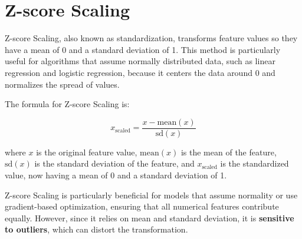 \documentclass[
]{book}
\theoremstyle{definition}
\theoremstyle{definition}
\theoremstyle{definition}
\theoremstyle{definition}
\theoremstyle{remark}
\begin{document}
\section{Z-score Scaling}\label{z-score-scaling}

Z-score Scaling, also known as standardization, transforms feature values so they have a mean of 0 and a standard deviation of 1. This method is particularly useful for algorithms that assume normally distributed data, such as linear regression and logistic regression, because it centers the data around 0 and normalizes the spread of values.

The formula for Z-score Scaling is:

\[
x_{\text{scaled}} = \frac{x - \text{mean}(x)}{\text{sd}(x)}
\]

where \(x\) is the original feature value, \(\text{mean}(x)\) is the mean of the feature, \(\text{sd}(x)\) is the standard deviation of the feature, and \(x_{\text{scaled}}\) is the standardized value, now having a mean of 0 and a standard deviation of 1.

Z-score Scaling is particularly beneficial for models that assume normality or use gradient-based optimization, ensuring that all numerical features contribute equally. However, since it relies on mean and standard deviation, it is \textbf{sensitive to outliers}, which can distort the transformation.
\end{document}
